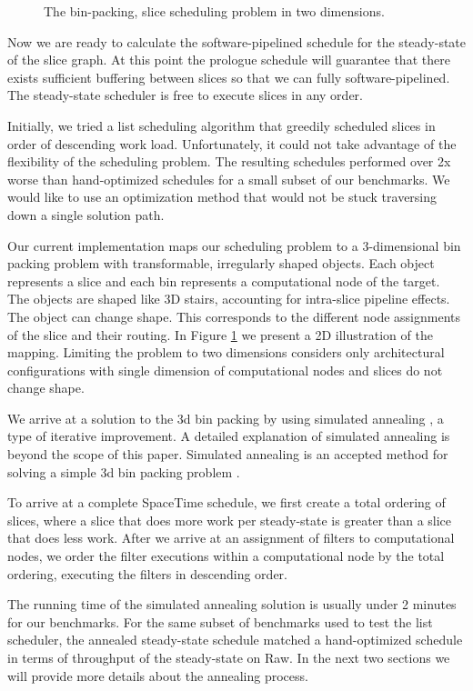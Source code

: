 \begin{figure}
\centering
{}
\caption{The bin-packing, slice scheduling problem in two dimensions.
\protect\label{fig:2d}}
\end{figure}
Now we are ready to calculate the software-pipelined schedule for the
steady-state of the slice graph.  At this point the prologue schedule
will guarantee that there exists sufficient buffering between slices
so that we can fully software-pipelined. The steady-state scheduler is
free to execute slices in any order.

Initially, we tried a list scheduling algorithm that greedily
scheduled slices in order of descending work load. Unfortunately, it
could not take advantage of the flexibility of the scheduling problem.
The resulting schedules performed over 2x worse than hand-optimized
schedules for a small subset of our benchmarks. We would like to use
an optimization method that would not be stuck traversing down a
single solution path.

Our current implementation maps our scheduling problem to a
3-dimensional bin packing problem with transformable, irregularly
shaped objects.  Each object represents a slice and each bin
represents a computational node of the target.  The objects are shaped
like 3D stairs, accounting for intra-slice pipeline effects. The
object can change shape.  This corresponds to the different node
assignments of the slice and their routing.  In Figure
\ref{fig:2d} we present a 2D illustration of the mapping.  Limiting
the problem to two dimensions considers only architectural
configurations with single dimension of computational nodes and slices
do not change shape.

We arrive at a solution to the 3d bin packing by using simulated
annealing \cite{simanneal}, a type of iterative improvement.  A
detailed explanation of simulated annealing is beyond the scope of
this paper.   Simulated annealing is an accepted method
for solving a simple 3d bin packing problem \cite{binpacking}. 

To arrive at a complete SpaceTime schedule, we first create a total
ordering of slices, where a slice that does more work per steady-state
is greater than a slice that does less work.  After we arrive at an
assignment of filters to computational nodes, we order the filter
executions within a computational node by the total ordering,
executing the filters in descending order.

The running time of the simulated annealing solution is usually under
2 minutes for our benchmarks.  For the same subset of benchmarks used
to test the list scheduler, the annealed steady-state schedule matched
a hand-optimized schedule in terms of throughput of the steady-state
on Raw.  In the next two sections we will provide more details about
the annealing process.

